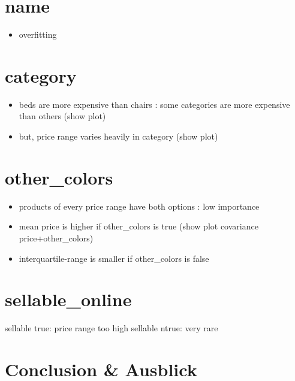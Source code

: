 \documentclass[a4paper, nobind]{templates/ociamthesis}
\providecommand{\tightlist}{%
  \setlength{\itemsep}{0pt}\setlength{\parskip}{0pt}}
\begin{document}
\hypertarget{name}{%
\section{name}\label{name}}

\begin{itemize}
\tightlist
\item
  overfitting
\end{itemize}

\hypertarget{category}{%
\section{category}\label{category}}

\begin{itemize}
\tightlist
\item
  beds are more expensive than chairs : some categories are more expensive than others (show plot)
\item
  but, price range varies heavily in category (show plot)
\end{itemize}

\hypertarget{other_colors}{%
\section{other\_colors}\label{other_colors}}

\begin{itemize}
\tightlist
\item
  products of every price range have both options : low importance
\item
  mean price is higher if other\_colors is true (show plot covariance price+other\_colors)
\item
  interquartile-range is smaller if other\_colors is false
\end{itemize}

\hypertarget{sellable_online}{%
\section{sellable\_online}\label{sellable_online}}

sellable true: price range too high
sellable ntrue: very rare

\hypertarget{conclusion-ausblick}{%
\section{Conclusion \& Ausblick}\label{conclusion-ausblick}}
\end{document}
